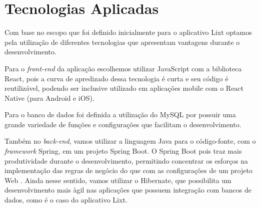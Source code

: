 \chapter{Tecnologias Aplicadas}

Com base no escopo que foi definido inicialmente para o aplicativo
Lixt optamos pela utilização de diferentes tecnologias que apresentam
vantagens durante o desenvolvimento.

Para o \textit{front-end} da aplicação escolhemos utilizar JavaScript
com a biblioteca React, pois a curva de apredizado dessa tecnologia é
curta e seu código é reutilizável, podendo ser inclusive utilizado em
aplicações mobile com o React Native (para Android e iOS).

Para o banco de dados foi definida a utilização do MySQL por possuir
uma grande variedade de funções e configurações que facilitam o
desenvolvimento.

Também no \textit{back-end}, vamos utilizar a linguagem Java
para o código-fonte, com o \textit{framework} Spring, em um
projeto Spring Boot. O Spring Boot pois traz mais
produtividade durante o desenvolvimento, permitindo concentrar os
esforços na implementação das regras de negócio do que com as
configurações de um projeto Web \cite{Alga2017}. Ainda nesse
sentido, vamos utilizar o Hibernate, que possibilita um
desenvolvimento mais àgil nas aplicações que possuem integração com
bancos de dados, como é o caso do aplicativo Lixt.

